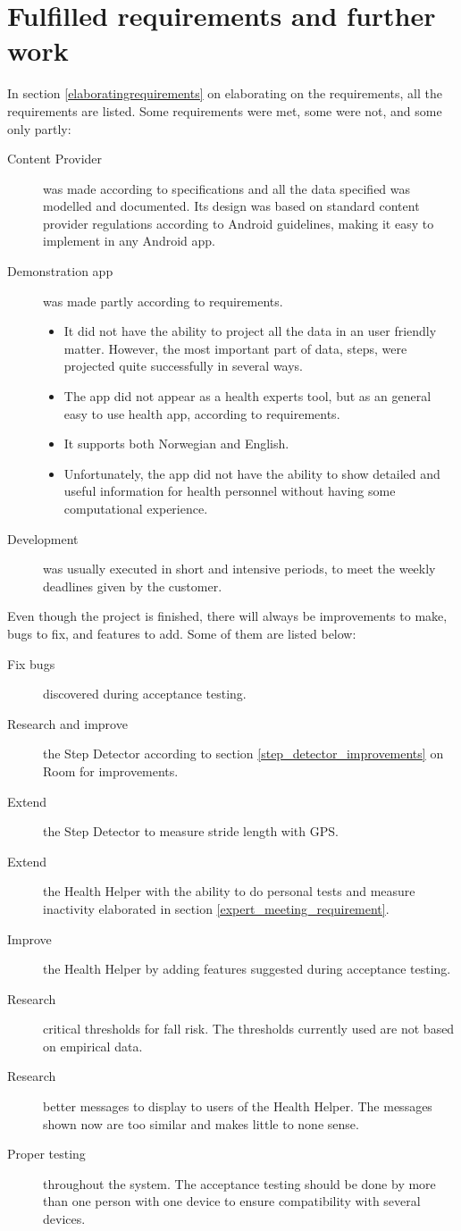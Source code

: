 \section{Fulfilled requirements and further work}
In section \ref{elaboratingrequirements} on elaborating on the requirements, all the requirements are listed. Some requirements were met, some were not, and some only partly:
\begin{description}
\item[Content Provider] was made according to specifications and all the data specified was modelled and documented. Its design was based on standard content provider regulations according to Android guidelines, making it easy to implement in any Android app.
\item[Demonstration app] was made partly according to requirements.
\begin{itemize}
\item It did not have the ability to project all the data in an user friendly matter. However, the most important part of data, steps, were projected quite successfully in several ways.
\item The app did not appear as a health experts tool, but as an general easy to use health app, according to requirements.
\item It supports both Norwegian and English.
\item Unfortunately, the app did not have the ability to show detailed and useful information for health personnel without having some computational experience.
\end{itemize} 
\item[Development] was usually executed in short and intensive periods, to meet the weekly deadlines given by the customer.
\end{description}
Even though the project is finished, there will always be improvements to make, bugs to fix, and features to add. Some of them are listed below:
\begin{description}
\item[Fix bugs] discovered during acceptance testing.
\item[Research and improve] the Step Detector according to section \ref{step_detector_improvements} on Room for improvements. 
\item[Extend] the Step Detector to measure stride length with GPS.
\item[Extend] the Health Helper with the ability to do personal tests and measure inactivity elaborated in section \ref{expert_meeting_requirement}.
\item[Improve] the Health Helper by adding features suggested during acceptance testing.
\item[Research] critical thresholds for fall risk. The thresholds currently used are not based on empirical data.
\item[Research] better messages to display to users of the Health Helper. The messages shown now are too similar and makes little to none sense.
\item[Proper testing] throughout the system. The acceptance testing should be done by more than one person with one device to ensure compatibility with several devices.
\end{description}
